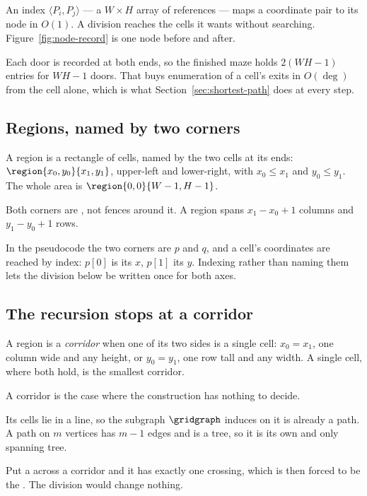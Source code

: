 An index $\langle P_i,P_j\rangle$ --- a $W\times H$ array of references --- maps
a coordinate pair to its node in $O(1)$. A division reaches the cells it wants
without searching. Figure~\ref{fig:node-record} is one node before and after.



Each door is recorded at both ends, so the finished maze holds $2(WH-1)$ entries
for $WH-1$ doors. That buys enumeration of a cell's exits in $O(\deg)$ from the
cell alone, which is what Section~\ref{sec:shortest-path} does at every step.

\subsection{Regions, named by two corners}
\label{sec:regions}

A region is a rectangle of cells, named by the two cells at its ends:
$\region{x_0,y_0}{x_1,y_1}$, upper-left and lower-right, with $x_0\le x_1$ and
$y_0\le y_1$. The whole area is $\region{0,0}{W-1,H-1}$.

Both corners are , not fences around it. A region
spans $x_1-x_0+1$ columns and $y_1-y_0+1$ rows.

In the pseudocode the two corners are $p$ and $q$, and a cell's coordinates are
reached by index: $p[0]$ is its $x$, $p[1]$ its $y$. Indexing rather than naming
them lets the division below be written once for both axes.

\subsection{The recursion stops at a corridor}
\label{sec:corridor-base}

\begin{definition}[Corridor]
\label{def:corridor}
A region is a \emph{corridor} when one of its two sides is a single cell:
$x_0=x_1$, one column wide and any height, or $y_0=y_1$, one row tall and any
width. A single cell, where both hold, is the smallest corridor.
\end{definition}

A corridor is the case where the construction has nothing to decide.

Its cells lie in a line, so the subgraph $\gridgraph$ induces on it is already a
path. A path on $m$ vertices has $m-1$ edges and is a tree, so it is its own and
only spanning tree.

Put a  across a corridor and it has exactly one crossing, which
is then forced to be the . The division would change nothing.

